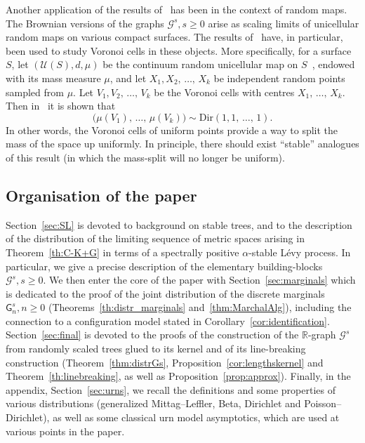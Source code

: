 \documentclass[AHL,Unicode,longabstracts,published]{cedram}
\newcommand{\Dir}{\mathrm{Dir}}
\newcommand{\cG}{\mathcal{G}}
\newcommand{\cU}{\mathcal{U}}
\newcommand{\sG}{\mathsf{G}}
\newcommand{\R}{\mathbb{R}}
\newcommand{\R}{\mathbb{R}}
\begin{document}
Another application of the results of~\cite{ABBrGo} has been in the context of random maps. The Brownian versions of the graphs $\cG^s, s \ge 0$ arise as scaling limits of unicellular random maps on various compact surfaces. The results of~\cite{ABBrGo} have, in particular, been used to study Voronoi cells in these objects. More specifically, for a surface $S$, let $(\cU(S), d, \mu)$ be the continuum random unicellular map on $S$~\cite{ABACFG}, endowed with its mass measure $\mu$, and let $X_1, X_2,\,\ldots,\, X_k$ be independent random points sampled from $\mu$. Let $V_1, V_2,\,\ldots,\, V_k$ be the Voronoi cells with centres $X_1,\, \ldots,\, X_k$. Then in~\cite{ABACFG} it is shown that
\[
\big(\mu(V_1),\, \ldots,\, \mu(V_k)\big) \sim \Dir(1,1,\,\ldots,\,1).
\]
In other words, the Voronoi cells of uniform points provide a way to split the mass of the space up uniformly. In principle, there should exist ``stable'' analogues of this result (in which the mass-split will no longer be uniform).

\subsection{Organisation of the paper}

Section~\ref{sec:SL} is devoted to background on stable trees, and to the description of the distribution of the limiting sequence of metric spaces arising in Theorem~\ref{th:C-K+G} in terms of a spectrally positive $\alpha$-stable Lévy process. In particular, we give a precise description of the elementary building-blocks $\cG^s, s \geq 0$. We then enter the core of the paper with Section~\ref{sec:marginals} which is dedicated to the proof of the joint distribution of the discrete marginals $\sG_n^s, n \geq 0$ (Theorems~\ref{th:distr_marginals} and~\ref{thm:MarchalAlg}), including the connection to a configuration model stated in Corollary~\ref{cor:identification}. Section~\ref{sec:final} is devoted to the proofs of the construction of the $\R$-graph $\cG^s$ from randomly scaled trees glued to its kernel and of its line-breaking construction (Theorem~\ref{thm:distrGs}, Proposition~\ref{cor:lengthskernel} and Theorem~\ref{th:linebreaking}, as well as Proposition~\ref{prop:approx}). Finally, in the appendix, Section~\ref{sec:urns}, we recall the definitions and some properties of various distributions (generalized Mittag--Leffler, Beta, Dirichlet and Poisson--Dirichlet), as well as some classical urn model asymptotics, which are used at various points in the paper.
\end{document}
